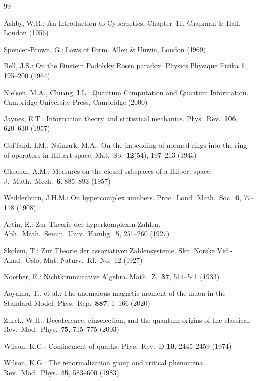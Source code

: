 \documentclass[11pt]{article}
\begin{document}
\begin{thebibliography}{99}

 Ashby, W.R.: An Introduction to Cybernetics, Chapter~11. Chapman \& Hall, London (1956)

 Spencer-Brown, G.: Laws of Form. Allen \& Unwin, London (1969)

 Bell, J.S.: On the Einstein Podolsky Rosen paradox. Physics Physique Fizika \textbf{1}, 195--200 (1964)

 Nielsen, M.A., Chuang, I.L.: Quantum Computation and Quantum Information. Cambridge University Press, Cambridge (2000)

 Jaynes, E.T.: Information theory and statistical mechanics. Phys.\ Rev.\ \textbf{106}, 620--630 (1957)

 Gel'fand, I.M., Na\u{\i}mark, M.A.: On the imbedding of normed rings into the ring of operators in Hilbert space. Mat.\ Sb.\ \textbf{12}(54), 197--213 (1943)

 Gleason, A.M.: Measures on the closed subspaces of a Hilbert space. J.\ Math.\ Mech.\ \textbf{6}, 885--893 (1957)

 Wedderburn, J.H.M.: On hypercomplex numbers. Proc.\ Lond.\ Math.\ Soc.\ \textbf{6}, 77--118 (1908)

 Artin, E.: Zur Theorie der hyperkomplexen Zahlen. Abh.\ Math.\ Semin.\ Univ.\ Hambg.\ \textbf{5}, 251--260 (1927)

 Skolem, T.: Zur Theorie der assoziativen Zahlensysteme. Skr.\ Norske Vid.-Akad.\ Oslo, Mat.-Naturv.\ Kl.\ No.~12 (1927)

 Noether, E.: Nichtkommutative Algebra. Math.\ Z.\ \textbf{37}, 514--541 (1933)

 Aoyama, T., et al.: The anomalous magnetic moment of the muon in the Standard Model. Phys.\ Rep.\ \textbf{887}, 1--166 (2020)

 Zurek, W.H.: Decoherence, einselection, and the quantum origins of the classical. Rev.\ Mod.\ Phys.\ \textbf{75}, 715--775 (2003)

 Wilson, K.G.: Confinement of quarks. Phys.\ Rev.\ D \textbf{10}, 2445--2459 (1974)

 Wilson, K.G.: The renormalization group and critical phenomena. Rev.\ Mod.\ Phys.\ \textbf{55}, 583--600 (1983)


\end{thebibliography}
\end{document}
